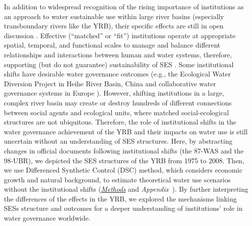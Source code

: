 In addition to widespread recognition of the rising importance of institutions as an approach to water sustainable use within large river basins (especially transboundary rivers like the YRB), their specific effects are still in open discussion \cite{agrawal2003, persha2011, agrawal2001}.
Effective (``matched'' or ``fit'') institutions operate at appropriate spatial, temporal, and functional scales to manage and balance different relationships and interactions between human and water systems, therefore, supporting (but do not guarantee) sustainability of SES \cite{epstein2015, wang2019d}.
Some institutional shifts have desirable water governance outcomes (e.g., the Ecological Water Diversion Project in Heihe River Basin, China \cite{wang2019d} and collaborative water governance systems in Europe \cite{green2013}).
However, shifting institutions in a large, complex river basin may create or destroy hundreds of different connections between social agents and ecological units, where matched social-ecological structures are not ubiquitous.
Therefore, the role of institutional shifts in the water governance achievement of the YRB and their impacts on water use is still uncertain without an understanding of SES structures.
Here, by abstracting changes in official documents following institutional shifts (the 87-WAS and the 98-UBR), we depicted the SES structures of the YRB from 1975 to 2008.
Then, we use Differenced Synthetic Control (DSC) method, which considers economic growth and natural background, to estimate theoretical water use scenarios without the institutional shifts (\textit{\hyperref[{sec:methods}]{Methods}} and \textit{Appendix~}).
By further interpreting the differences of the effects in the YRB, we explored the mechanisms linking SESs structure and outcomes for a deeper understanding of institutions' role in water governance worldwide.
